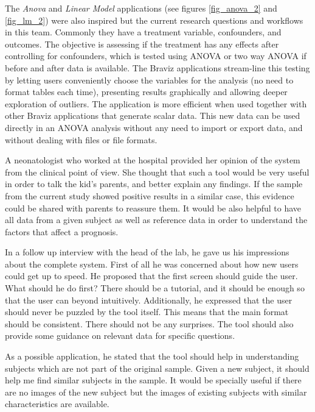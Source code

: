 The \emph{Anova} and \emph{Linear Model} applications (see figures \ref{fig_anova_2} and \ref{fig_lm_2}) were also inspired but the current research questions and workflows in this team. Commonly they have a treatment variable, confounders, and outcomes. The objective is assessing if the treatment has any effects after controlling for confounders, which is tested using ANOVA or two way ANOVA if before and after data is available. The Braviz applications stream-line this testing by letting users conveniently choose the variables for the analysis (no need to format tables each time), presenting results graphically and allowing deeper exploration of outliers. The application is more efficient when used together with other Braviz applications that generate scalar data. This new data can be used directly in an ANOVA analysis without any need to import or export data, and without dealing with files or file formats.

% 


A neonatologist who worked at the hospital provided her opinion of the system from the clinical point of view. She thought that such a tool would be very useful in order to talk the kid's parents, and better explain any findings. If the sample from the current study showed positive results in a similar case, this evidence could be shared with parents to reassure them. It would be also helpful to have all data from a given subject as well as reference data in order to understand the factors that affect a prognosis. 


In a follow up interview with the head of the lab, he gave us his impressions about the complete system. First of all he was concerned about how new users could get up to speed. He proposed that the first screen should guide the user. What should he do first? There should be a tutorial, and it should be enough so that the user can beyond intuitively. Additionally, he expressed that the user should never be puzzled by the tool itself. This means that the main format should be consistent. There should not be any surprises. The tool should also provide some guidance on relevant data for specific questions. 

As a possible application, he stated that the tool should help in understanding subjects which are not part of the original sample. Given a new subject, it should help me find similar subjects in the sample. It would be specially useful if there are no images of the new subject but the images of existing subjects with similar characteristics are available. 

